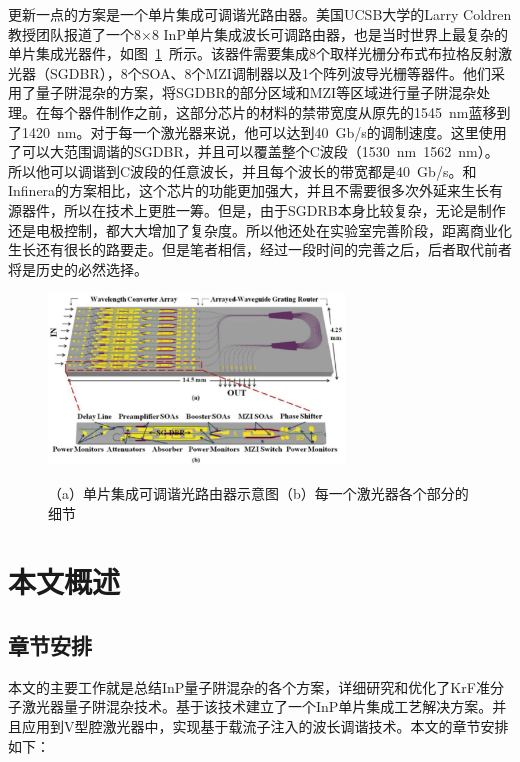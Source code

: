 \documentclass{ZJUthesis}
\begin{document}
更新一点的方案是一个单片集成可调谐光路由器。美国UCSB大学的Larry Coldren教授团队报道了一个8×8 InP单片集成波长可调路由器\cite{Nicholes2010An}，也是当时世界上最复杂的单片集成光器件，如图~\ref{fig_motor}~所示。该器件需要集成8个取样光栅分布式布拉格反射激光器（SGDBR），8个SOA、8个MZI调制器以及1个阵列波导光栅等器件。他们采用了量子阱混杂的方案，将SGDBR的部分区域和MZI等区域进行量子阱混杂处理。在每个器件制作之前，这部分芯片的材料的禁带宽度从原先的1545~nm蓝移到了1420~nm。对于每一个激光器来说，他可以达到40~Gb/s的调制速度。这里使用了可以大范围调谐的SGDBR，并且可以覆盖整个C波段（1530~nm~1562~nm）。所以他可以调谐到C波段的任意波长，并且每个波长的带宽都是40~Gb/s。和Infinera的方案相比，这个芯片的功能更加强大，并且不需要很多次外延来生长有源器件，所以在技术上更胜一筹。但是，由于SGDRB本身比较复杂，无论是制作还是电极控制，都大大增加了复杂度。所以他还处在实验室完善阶段，距离商业化生长还有很长的路要走。但是笔者相信，经过一段时间的完善之后，后者取代前者将是历史的必然选择。

\begin{figure}[htbp]
  \centering
  \includegraphics[width=0.7\textwidth]{./Pictures/motor.eps}\\
  \caption{（a）单片集成可调谐光路由器示意图（b）每一个激光器各个部分的细节\cite{Nicholes2010An}}
  \label{fig_motor}
\end{figure}

\section{本文概述}

\subsection{章节安排}
本文的主要工作就是总结InP量子阱混杂的各个方案，详细研究和优化了KrF准分子激光器量子阱混杂技术。基于该技术建立了一个InP单片集成工艺解决方案。并且应用到V型腔激光器中，实现基于载流子注入的波长调谐技术。本文的章节安排如下：
\end{document}
